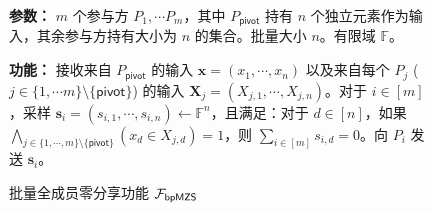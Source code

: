 \begin{figure}[!hbtp]
\begin{framed}
\begin{minipage}[c]{\textwidth}
\begin{trivlist}
\item \textbf{参数：} $m$ 个参与方 $P_1, \cdots P_m$，其中 $P_\mathsf{pivot}$ 持有 $n$ 个独立元素作为输入，其余参与方持有大小为 $n$ 的集合。批量大小 $n$。有限域 $\mathbb{F}$。 
\item \textbf{功能：} 接收来自 $P_\mathsf{pivot}$ 的输入 $\textbf{x} = (x_1, \cdots, x_n)$ 以及来自每个 $P_j$ ($j \in \{1,\cdots m\} \setminus \{\mathsf{pivot}\}$) 的输入 $\textbf{X}_j = (X_{j,1}, \cdots, X_{j,n})$。对于 $i \in [m]$，采样 $\textbf{s}_i = (s_{i,1}, \cdots, s_{i,n}) \gets \mathbb{F}^n$，且满足：对于 $d \in [n]$，如果 $\bigwedge_{j \in \{1,\cdots,m\} \setminus \{\mathsf{pivot}\}} (x_d \in X_{j,d}) = 1$，则 $\sum_{i \in [m]} s_{i,d} = 0$。向 $P_i$ 发送 $\textbf{s}_i$。
\end{trivlist}
\end{minipage}
\end{framed}
\caption{批量全成员零分享功能 $\mathcal{F}_\mathsf{bpMZS}$}\label{fig:func-bpmzs}
\end{figure}

